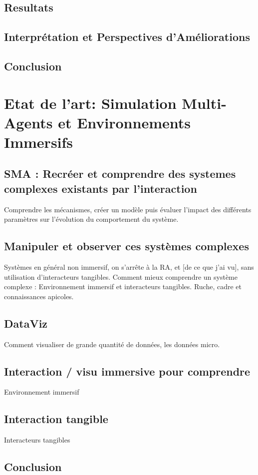 \documentclass[11pt,a4paper]{report}
\begin{document}
	\section{Resultats}
	\section{Interprétation et Perspectives d'Améliorations}
			
	\section*{Conclusion}


\chapter{Etat de l'art: Simulation Multi-Agents et Environnements Immersifs}
	\section{SMA : Recréer et comprendre des systemes complexes existants par l'interaction}
		Comprendre les mécanismes, créer un modèle puis évaluer l'impact des différents paramètres sur l'évolution du comportement du système.
	\section{Manipuler et observer ces systèmes complexes}
		Systèmes en général non immersif, on s'arrête à la RA, et [de ce que j'ai vu], sans utilisation d'interacteurs tangibles.
	Comment mieux comprendre un système complexe : Environnement immersif et interacteurs tangibles. Ruche, cadre et connaissances apicoles.
	\section{DataViz}
		Comment visualiser de grande quantité de données, les données micro.
	\section{Interaction / visu immersive pour comprendre}
		Environnement immersif
	\section{Interaction tangible}
		Interacteurs tangibles
		
			
	\section*{Conclusion}
		
\end{document}
